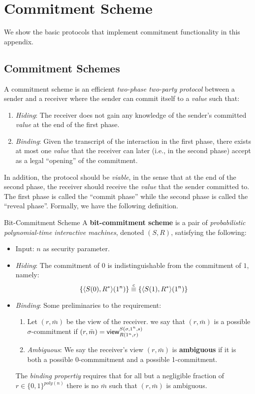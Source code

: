 \section{Commitment Scheme}
We show the basic protocols that implement commitment functionality in this appendix.
\subsection{Commitment Schemes}
A commitment scheme is an efficient {\it two-phase two-party protocol\/} between a sender and a receiver where the sender can commit itself to a {\it value\/} such that:
\begin{enumerate}
\item {\it Hiding\/}: The receiver does not gain any knowledge of the sender's committed {\it value\/} at the end of the first phase.
\item {\it Binding\/}: Given the transcript of the interaction in the first phase, there exists at most one {\it value\/} that the receiver can later (i.e., in the second phase) accept as a legal ``opening'' of the commitment.
\end{enumerate}
In addition, the protocol should be {\it viable\/}, in the sense that at the end of the second phase, the receiver should receive the {\it value\/} that the sender committed to. The first phase is called the ``commit phase'' while the second phase is called the ``reveal phase''. Formally, we have the following definition.
\begin{definition}{Bit-Commitment Scheme} A {\bf bit-commitment scheme} is a pair of {\it probabilistic polynomial-time interactive machines\/}, denoted $(S,R)$, satisfying the following:
\begin{itemize}
\item Input: $n$ as security parameter.
\item {\it Hiding\/}: The commitment of $0$ is indistinguishable from the commitment of $1$, namely:
$$
    \{\langle S(0),R^*\rangle(1^n)\}\stackrel{c}{\equiv}\{\langle S(1),R^*\rangle(1^n)\}
$$
\item {\it Binding}: Some preliminaries to the requirement:
    \begin{enumerate}
        \item Let $(r,\bar{m})$ be the view of the receiver. we say that $(r,\bar{m})$ is a possible $\sigma$-commitment if $(r,\bar{m})={\sf view}_{R(1^n,r)}^{S(\sigma,1^n,s)}$
        \item {\it Ambiguous}: We say the receiver's view $(r,\bar{m})$ is {\bf ambiguous} if it is both a possible 0-commmitment and a possible 1-commitment.
    \end{enumerate}
The {\it binding propertiy} requires that for all but a negligible fraction of $r\in\{0,1\}^{poly(n)}$ there is no $\bar{m}$ such that $(r,\bar{m})$ is ambiguous.
\end{itemize}
\end{definition}
